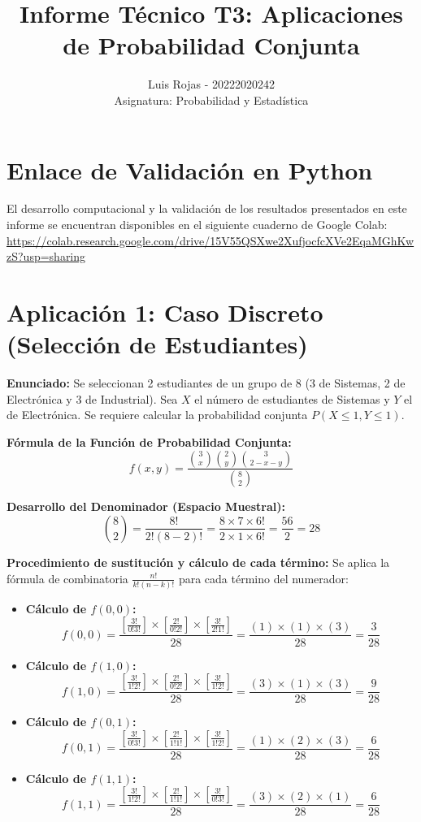 \documentclass[12pt,a4paper]{article}
\title{\textbf{Informe Técnico T3: Aplicaciones de Probabilidad Conjunta}}
\author{Luis Rojas - 20222020242 \\ Asignatura: Probabilidad y Estadística}
\date{}
\begin{document}
\maketitle

\section*{Enlace de Validación en Python}
El desarrollo computacional y la validación de los resultados presentados en este informe se encuentran disponibles en el siguiente cuaderno de Google Colab: \\
\url{https://colab.research.google.com/drive/15V55QSXwe2XufjocfcXVe2EqaMGhKwzS?usp=sharing}

\section{Aplicación 1: Caso Discreto (Selección de Estudiantes)}
\textbf{Enunciado:} Se seleccionan 2 estudiantes de un grupo de 8 (3 de Sistemas, 2 de Electrónica y 3 de Industrial). Sea $X$ el número de estudiantes de Sistemas y $Y$ el de Electrónica. Se requiere calcular la probabilidad conjunta $P(X \le 1, Y \le 1)$.

\textbf{Fórmula de la Función de Probabilidad Conjunta:}
\[ f(x,y) = \frac{\binom{3}{x} \binom{2}{y} \binom{3}{2-x-y}}{\binom{8}{2}} \]

\textbf{Desarrollo del Denominador (Espacio Muestral):}
\[ \binom{8}{2} = \frac{8!}{2!(8-2)!} = \frac{8 \times 7 \times 6!}{2 \times 1 \times 6!} = \frac{56}{2} = 28 \]

\textbf{Procedimiento de sustitución y cálculo de cada término:}
Se aplica la fórmula de combinatoria $\frac{n!}{k!(n-k)!}$ para cada término del numerador:

\begin{itemize}
    \item \textbf{Cálculo de $f(0,0)$:}
    \[ f(0,0) = \frac{\left[ \frac{3!}{0!3!} \right] \times \left[ \frac{2!}{0!2!} \right] \times \left[ \frac{3!}{2!1!} \right]}{28} = \frac{(1) \times (1) \times (3)}{28} = \frac{3}{28} \]
    
    \item \textbf{Cálculo de $f(1,0)$:}
    \[ f(1,0) = \frac{\left[ \frac{3!}{1!2!} \right] \times \left[ \frac{2!}{0!2!} \right] \times \left[ \frac{3!}{1!2!} \right]}{28} = \frac{(3) \times (1) \times (3)}{28} = \frac{9}{28} \]
    
    \item \textbf{Cálculo de $f(0,1)$:}
    \[ f(0,1) = \frac{\left[ \frac{3!}{0!3!} \right] \times \left[ \frac{2!}{1!1!} \right] \times \left[ \frac{3!}{1!2!} \right]}{28} = \frac{(1) \times (2) \times (3)}{28} = \frac{6}{28} \]
    
    \item \textbf{Cálculo de $f(1,1)$:}
    \[ f(1,1) = \frac{\left[ \frac{3!}{1!2!} \right] \times \left[ \frac{2!}{1!1!} \right] \times \left[ \frac{3!}{0!3!} \right]}{28} = \frac{(3) \times (2) \times (1)}{28} = \frac{6}{28} \]
\end{itemize}
\end{document}
